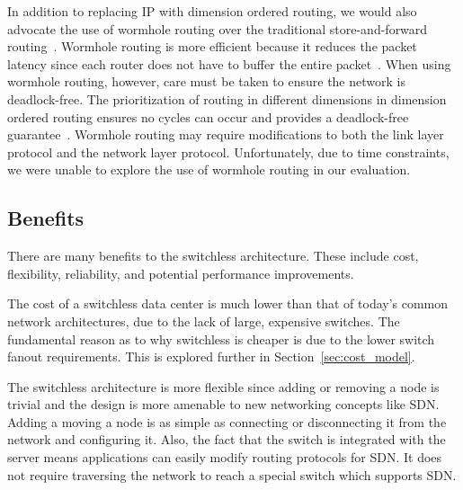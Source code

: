   
In addition to replacing IP with dimension ordered routing, we would also advocate the use of wormhole routing over the traditional store-and-forward routing~\cite{Ni:1993:SWRTDN}.  Wormhole routing is more efficient because it reduces the packet latency since each router does not have to buffer the entire packet~\cite{Boppana:1995:FTWRAMN,Dally:1987:DFMRMIN,Ni:1993:SWRTDN}.  When using wormhole routing, however, care must be taken to ensure the network is deadlock-free.  The prioritization of routing in different dimensions in dimension ordered routing ensures no cycles can occur and provides a deadlock-free guarantee~\cite{Ni:1993:SWRTDN}.  Wormhole routing may require modifications to both the link layer protocol and the network layer protocol.  Unfortunately, due to time constraints, we were unable to explore the use of wormhole routing in our evaluation.



\subsection{Benefits}

There are many benefits to the switchless architecture.  These include cost, flexibility, reliability, and potential performance improvements.  

The cost of a switchless data center is much lower than that of today's common network architectures, due to the lack of large, expensive switches. The fundamental reason as to why switchless is cheaper is due to the lower switch fanout requirements.  This is explored further in Section~\ref{sec:cost_model}.

The switchless architecture is more flexible since adding or removing a node is trivial and the design is more amenable to new networking concepts like SDN.  Adding a moving a node is as simple as connecting or disconnecting it from the network and configuring it.  Also, the fact that the switch is integrated with the server means applications can easily modify routing protocols for SDN.  It does not require traversing the network to reach a special switch which supports SDN.

